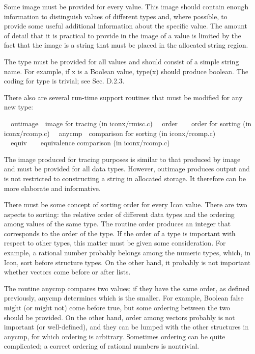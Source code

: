Some image must be provided for every value. This image should contain
enough information to distinguish values of different types and, where
possible, to provide some useful additional information about the
specific value. The amount of detail that it is practical to provide
in the image of a value is limited by the fact that the image is a
string that must be placed in the allocated string region.


The type must be provided for all values and should consist of a
simple string name. For example, if x is a Boolean value, type(x)
should produce {\textquotedbl}boolean{\textquotedbl}. The coding for
type is trivial; see Sec. D.2.3.

There also are several run-time support routines that must be modified
for any new type:


\ \ outimage\ \ image for tracing (in iconx/rmisc.c)\newline
\ \ order\ \ \ \ order for sorting (in iconx/rcomp.c)\newline
\ \ anycmp\ \ comparison for sorting (in iconx/rcomp.c)\newline
\ \ equiv\ \ \ \ equivalence comparison (in iconx/rcomp.c)


The image produced for tracing purposes is similar to that produced by
image and must be provided for all data types.  However, outimage
produces output and is not restricted to constructing a string in
allocated storage. It therefore can be more elaborate and informative.

There must be some concept of sorting order for every Icon
value. There are two aspects to sorting: the relative order of
different data types and the ordering among values of the same
type. The routine order produces an integer that corresponds to the
order of the type. If the order of a type is important with respect to
other types, this matter must be given some consideration. For
example, a rational number probably belongs among the numeric types,
which, in Icon, sort before structure types. On the other hand, it
probably is not important whether vectors come before or after lists.


The routine anycmp compares two values; if they have the same order,
as defined previously, anycmp determines which is the
{\textquotedbl}smaller.{\textquotedbl} For example, Boolean
{\textquotedbl}false{\textquotedbl} might (or might not) come before
{\textquotedbl}true,{\textquotedbl} but some ordering between the two
should be provided. On the other hand, order among vectors probably is
not important (or well-defined), and they can be lumped with the other
structures in anycmp, for which ordering is arbitrary. Sometimes
ordering can be quite complicated; a correct ordering of rational
numbers is nontrivial.


